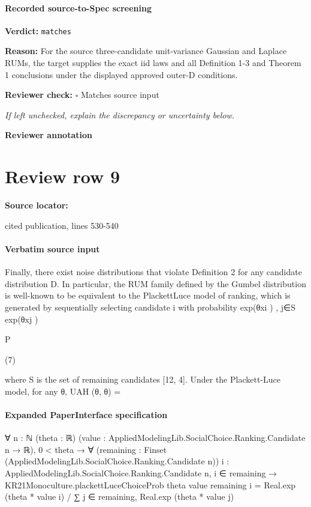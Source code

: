 \documentclass[10pt]{article}
\newcommand{\reviewerbox}{%
  \par\noindent\fbox{\parbox{0.96\linewidth}{\rule{0pt}{0.38in}}}\par
}
\newcommand{\reviewmatch}[1]{%
  \par\noindent\textbf{Reviewer check:} $\square$\; #1\par
  \noindent\emph{If left unchecked, explain the discrepancy or uncertainty below.}\par
}
\begin{document}
\paragraph{Recorded source-to-Spec screening}
\textbf{Verdict:} \texttt{matches}
\\
{\raggedright
\textbf{Reason:} For the source three-\allowbreak{}candidate unit-\allowbreak{}variance Gaussian and Laplace RUMs, the target supplies the exact iid laws and all Definition 1-\allowbreak{}3 and Theorem 1 conclusions under the displayed approved outer-\allowbreak{}D conditions.\allowbreak{}
\par}
\reviewmatch{Matches source input}
\noindent\textbf{Reviewer annotation}\par
\reviewerbox
\clearpage
\hypertarget{source-claim-8940f397fa4678ac}{}
\section*{Review row 9}
\textbf{Source locator:} {\footnotesize\raggedright cited publication, lines 530-\allowbreak{}540\par}
\paragraph{Verbatim source input}
\begin{ReviewVerbatim}
Finally, there exist noise distributions that violate Definition 2 for any candidate distribution D. In
particular, the RUM family defined by the Gumbel distribution is well-known to be equivalent to the PlackettLuce model of ranking, which is generated by sequentially selecting candidate i with probability
exp(θxi )
,
j∈S exp(θxj )

P

(7)

where S is the set of remaining candidates [12, 4]. Under the Plackett-Luce model, for any θ, UAH (θ, θ) =
\end{ReviewVerbatim}



\paragraph{Expanded PaperInterface specification}
\begin{ReviewVerbatim}
∀ {n : ℕ} (theta : ℝ) (value : AppliedModelingLib.SocialChoice.Ranking.Candidate n → ℝ),
  0 < theta →
    ∀ (remaining : Finset (AppliedModelingLib.SocialChoice.Ranking.Candidate n))
      {i : AppliedModelingLib.SocialChoice.Ranking.Candidate n},
      i ∈ remaining →
        KR21Monoculture.plackettLuceChoiceProb theta value remaining i =
          Real.exp (theta * value i) / ∑ j ∈ remaining, Real.exp (theta * value j)
\end{ReviewVerbatim}
\end{document}
